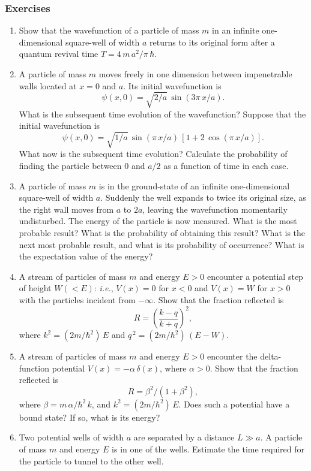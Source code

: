 \subsubsection*{Exercises}
{\small
\begin{enumerate}
\item Show that the wavefunction of a particle of mass $m$ in an infinite one-dimensional square-well of width $a$
returns to its original form after a quantum revival time $T=4\,m\,a^2/\pi\,\hbar$. 

\item A particle of mass $m$ moves freely in one dimension between
impenetrable walls located at 
$x=0$ and $a$. Its initial wavefunction is
$$
\psi(x,0) = \sqrt{2/a}\,\sin(3\pi\,x/a).
$$
What is the subsequent time evolution of the wavefunction?
Suppose that the initial wavefunction is 
$$
\psi(x,0) = \sqrt{1/a}\,\sin(\pi\,x/a)\,[1+2\,\cos(\pi\,x/a)].
$$
What now is the subsequent time evolution? Calculate the probability
of finding the particle between 0 and $a/2$ as a function of time in
each case.

\item A particle of mass $m$ is in the ground-state of an infinite one-dimensional square-well of width $a$. Suddenly the well expands to
twice its original size, as the right wall moves from $a$ to $2a$, leaving
the wavefunction momentarily undisturbed. The energy of the particle
is now measured. What is the most probable result? What is the probability
of obtaining this result? What is the next most probable result, and
what is its probability of occurrence? What is the expectation value
of the energy? 

\item A stream of particles of mass $m$ and energy $E>0$ encounter a
potential step of height $W (<E)$: {\em i.e.}, $V(x)=0$ for $x<0$ and
$V(x)=W$ for $x>0$ with the particles incident from $-\infty$. Show that the fraction
reflected is
$$
R = \left(\frac{k-q}{k+q}\right)^2,
$$
where $k^2= (2m/\hbar^2)\,E$ and $q^{\,2}= (2m/\hbar^2)\,(E-W)$. 

\item A stream of particles of mass $m$ and energy $E>0$ encounter the
delta-function potential $V(x) = -\alpha\,\delta (x)$, where
$\alpha>0$.  Show that the fraction
reflected is
$$
R = \beta^2/(1+\beta^2),
$$
where $\beta= m\,\alpha/\hbar^2\,k$, and $k^2= (2m/\hbar^2)\,E$. 
Does such a potential have a bound state? If so, what is its
energy?

\item Two potential wells of width $a$ are separated by a distance $L\gg a$.
A particle of mass $m$ and energy $E$ is in one of the wells. Estimate
the time required for the particle to tunnel to the other well.


\end{enumerate}}
